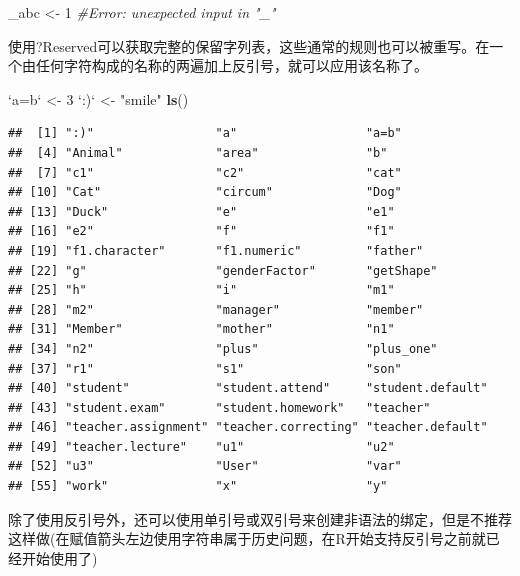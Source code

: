 \documentclass[]{book}
\newenvironment{Shaded}{\begin{snugshade}}{\end{snugshade}}
\newcommand{\KeywordTok}[1]{\textcolor[rgb]{0.13,0.29,0.53}{\textbf{#1}}}
\newcommand{\DataTypeTok}[1]{\textcolor[rgb]{0.13,0.29,0.53}{#1}}
\newcommand{\DecValTok}[1]{\textcolor[rgb]{0.00,0.00,0.81}{#1}}
\newcommand{\StringTok}[1]{\textcolor[rgb]{0.31,0.60,0.02}{#1}}
\newcommand{\CommentTok}[1]{\textcolor[rgb]{0.56,0.35,0.01}{\textit{#1}}}
\newcommand{\NormalTok}[1]{#1}
\begin{document}
\begin{Shaded}
\begin{Highlighting}[]
\NormalTok{_abc <-}\StringTok{ }\DecValTok{1}
\CommentTok{#Error: unexpected input in "_"}
\end{Highlighting}
\end{Shaded}

使用?Reserved可以获取完整的保留字列表，这些通常的规则也可以被重写。在一个由任何字符构成的名称的两遍加上反引号，就可以应用该名称了。

\begin{Shaded}
\begin{Highlighting}[]
\StringTok{`}\DataTypeTok{a=b}\StringTok{`}\NormalTok{ <-}\StringTok{ }\DecValTok{3}
\StringTok{`}\DataTypeTok{:)}\StringTok{`}\NormalTok{ <-}\StringTok{ "smile"}
\KeywordTok{ls}\NormalTok{()}
\end{Highlighting}
\end{Shaded}

\begin{verbatim}
##  [1] ":)"                 "a"                  "a=b"               
##  [4] "Animal"             "area"               "b"                 
##  [7] "c1"                 "c2"                 "cat"               
## [10] "Cat"                "circum"             "Dog"               
## [13] "Duck"               "e"                  "e1"                
## [16] "e2"                 "f"                  "f1"                
## [19] "f1.character"       "f1.numeric"         "father"            
## [22] "g"                  "genderFactor"       "getShape"          
## [25] "h"                  "i"                  "m1"                
## [28] "m2"                 "manager"            "member"            
## [31] "Member"             "mother"             "n1"                
## [34] "n2"                 "plus"               "plus_one"          
## [37] "r1"                 "s1"                 "son"               
## [40] "student"            "student.attend"     "student.default"   
## [43] "student.exam"       "student.homework"   "teacher"           
## [46] "teacher.assignment" "teacher.correcting" "teacher.default"   
## [49] "teacher.lecture"    "u1"                 "u2"                
## [52] "u3"                 "User"               "var"               
## [55] "work"               "x"                  "y"
\end{verbatim}

除了使用反引号外，还可以使用单引号或双引号来创建非语法的绑定，但是不推荐这样做(在赋值箭头左边使用字符串属于历史问题，在R开始支持反引号之前就已经开始使用了)
\end{document}

